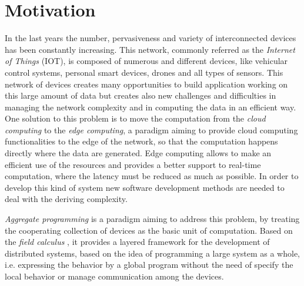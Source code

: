 \section{Motivation}
In the last years the number, pervasiveness and variety of interconnected devices has been constantly increasing. This network, commonly referred as the \textit{Internet of Things} (IOT), is composed of numerous and different devices, like vehicular control systems, personal smart devices, drones and all types of sensors. This network of devices creates many opportunities to build application working on this large amount of data but creates also new challenges and difficulties in managing the network complexity and in computing the data in an efficient way. One solution to this problem is to move the computation from the \textit{cloud computing} to the \textit{edge computing}, a paradigm aiming to provide cloud computing functionalities to the edge of the network, so that the computation happens directly where the data are generated. Edge computing allows to make an efficient use of the resources and provides a better support to real-time computation, where the latency must be reduced as much as possible. In order to develop this kind of system new software development methods are needed to deal with the deriving complexity.

\textit{Aggregate programming} \cite{Aggregate01} is a paradigm aiming to address this problem, by treating the cooperating collection of devices as the basic unit of computation. Based on the \textit{field calculus} \cite{FieldCalculus}, it provides a layered framework for the development of distributed systems, based on the idea of programming a large system as a whole, i.e. expressing the behavior by a global program without the need of specify the local behavior or manage communication among the devices.

